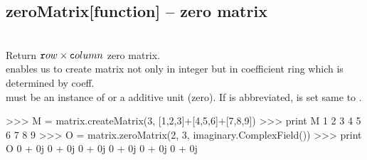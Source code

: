  \subsection{zeroMatrix[function] -- zero matrix}
  \\
   \spacing
   \quad Return ${\texttt row}\times{\texttt column}$ zero matrix.\\
   \spacing
   \quad {} enables us to create matrix not only in integer but in coefficient ring which is determined by coeff. \\
   \spacing
     must be an instance of  or a additive unit (zero).
    If  is abbreviated,  is set same to .\begin{ex}
>>> M = matrix.createMatrix(3, [1,2,3]+[4,5,6]+[7,8,9])
>>> print M
1 2 3
4 5 6
7 8 9
>>> O = matrix.zeroMatrix(2, 3, imaginary.ComplexField())
>>> print O
0 + 0j 0 + 0j 0 + 0j
0 + 0j 0 + 0j 0 + 0j
\end{ex}
\C



